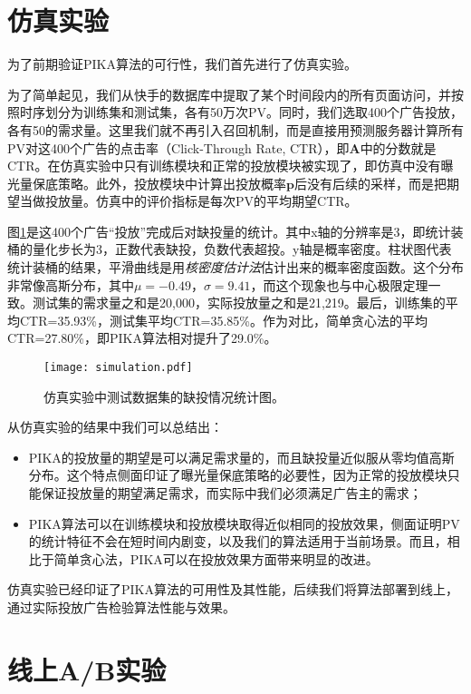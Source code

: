\section{仿真实验}

为了前期验证PIKA算法的可行性，我们首先进行了仿真实验。

为了简单起见，我们从快手的数据库中提取了某个时间段内的所有页面访问，并按照时序划分为训练集和测试集，各有50万次PV。同时，我们选取400个广告投放，各有50的需求量。这里我们就不再引入召回机制，而是直接用预测服务器计算所有PV对这400个广告的点击率（Click-Through Rate, CTR），即$\bm{A}$中的分数就是CTR。在仿真实验中只有训练模块和正常的投放模块被实现了，即仿真中没有曝光量保底策略。此外，投放模块中计算出投放概率$\bm{p}$后没有后续的采样，而是把期望当做投放量。仿真中的评价指标是每次PV的平均期望CTR。

图\ref{fig:delivery}是这400个广告“投放”完成后对缺投量的统计。其中x轴的分辨率是3，即统计装桶的量化步长为3，正数代表缺投，负数代表超投。y轴是概率密度。柱状图代表统计装桶的结果，平滑曲线是用\textit{核密度估计法}估计出来的概率密度函数。这个分布非常像高斯分布，其中$\mu = -0.49$，$\sigma = 9.41$，而这个现象也与中心极限定理一致。测试集的需求量之和是20,000，实际投放量之和是21,219。最后，训练集的平均CTR=35.93\%，测试集平均CTR=35.85\%。作为对比，简单贪心法的平均CTR=27.80\%，即PIKA算法相对提升了29.0\%。

\begin{figure}[htb]
	\centering
	\texttt{[image: simulation.pdf]}
	\caption{仿真实验中测试数据集的缺投情况统计图。}
	\label{fig:delivery}
\end{figure}

从仿真实验的结果中我们可以总结出：
\begin{itemize}
	\item PIKA的投放量的期望是可以满足需求量的，而且缺投量近似服从零均值高斯分布。这个特点侧面印证了曝光量保底策略的必要性，因为正常的投放模块只能保证投放量的期望满足需求，而实际中我们必须满足广告主的需求；
	\item PIKA算法可以在训练模块和投放模块取得近似相同的投放效果，侧面证明PV的统计特征不会在短时间内剧变，以及我们的算法适用于当前场景。而且，相比于简单贪心法，PIKA可以在投放效果方面带来明显的改进。
\end{itemize}

仿真实验已经印证了PIKA算法的可用性及其性能，后续我们将算法部署到线上，通过实际投放广告检验算法性能与效果。

\section{线上A/B实验}

